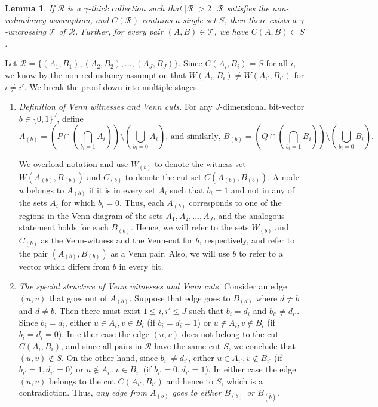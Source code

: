 \documentclass[11pt]{article}
\newtheorem{lemma}[theorem]{Lemma}
\newenvironment{proofnoqed}{{\bf Proof:}}{}
\newcommand{\coll}{{\mathcal R}}
\newcommand{\colltwo}{{\mathcal T}}
\begin{document}
\begin{lemma}
  \label{lem:uncross}
  If $\coll$ is a $\gamma$-thick collection such that $|\coll| > 2$, $\coll$
  satisfies the non-redundancy assumption, and $C(\coll)$ contains a single
  set $S$, then there exists a $\gamma$-uncrossing $\colltwo$ of
  $\coll$. Further, for every pair $(A,B)\in \colltwo$, we have $C(A,B)
  \subset S$.
\end{lemma}
\begin{proofnoqed}
  Let $\coll = \{(A_1,B_1), (A_2,B_2), \ldots, (A_J,B_J)\}$. Since $C(A_i,B_i)
  = S$ for all $i$, we know by the non-redundancy assumption that $W(A_i,B_i)
  \neq W(A_{i'},B_{i'})$ for $i\neq i'$. We break the proof down into multiple
  stages.

  \begin{enumerate}
  \item {\em Definition of Venn witnesses and Venn cuts. } For any
    $J$-dimensional bit-vector $b\in\{0,1\}^J$, define
    $$A_{(b)} = \left(P
      \cap \left(\bigcap_{b_i = 1} A_i\right)\right) \setminus
    \left(\bigcup_{b_i=0} A_i\right) \mbox{, and similarly, } B_{(b)} =
    \left(Q\cap\left(\bigcap_{b_i = 1} B_i\right)\right) \setminus
    \left(\bigcup_{b_i=0} B_i\right).$$

    We overload notation and use $W_{(b)}$ to denote the witness set
    $W(A_{(b)},B_{(b)})$ and $C_{(b)}$ to denote the cut set
    $C(A_{(b)},B_{(b)})$. A node $u$ belongs to $A_{(b)}$ if it is in every
    set $A_i$ such that $b_i=1$ and not in any of the sets $A_i$ for which
    $b_i=0$. Thus, each $A_{(b)}$ corresponds to one of the regions in the
    Venn diagram of the sets $A_1, A_2, \ldots, A_J$, and the analogous
    statement holds for each $B_{(b)}$. Hence, we will refer to the sets
    $W_{(b)}$ and $C_{(b)}$ as the Venn-witness and the Venn-cut for $b$,
    respectively, and refer to the pair $(A_{(b)},B_{(b)})$ as a Venn
    pair. Also, we will use $\overline{b}$ to refer to a vector which differs
    from $b$ in every bit.

  \item {\em The special structure of Venn witnesses and Venn cuts.} Consider
    an edge $(u,v)$ that goes out of $A_{(b)}$. Suppose that edge goes to
    $B_{(d)}$ where $d\neq b$ and $d\neq \overline{b}$. Then there must exist
    $1\leq i,i' \leq J$ such that $b_i = d_i$ and $b_{i'} \neq d_{i'}$. Since
    $b_i = d_i$, either $u\in A_i, v\in B_i$ (if $b_i = d_i = 1$) or $u\not\in
    A_i, v\not\in B_i$ (if $b_i = d_i = 0$). In either case the edge $(u,v)$
    does not belong to the cut $C(A_i, B_i)$, and since all pairs in $\coll$
    have the same cut $S$, we conclude that $(u,v) \not\in S$. On the other
    hand, since $b_{i'} \neq d_{i'}$, either $u\in A_{i'}, v\not\in B_{i'}$
    (if $b_{i'} = 1, d_{i'} = 0$) or $u\not\in A_{i'}, v\in B_{i'}$ (if
    $b_{i'} = 0, d_{i'} = 1$). In either case the edge $(u,v)$ belongs to the
    cut $C(A_{i'},B_{i'})$ and hence to $S$, which is a contradiction. Thus,
    {\em any edge from $A_{(b)}$ goes to either $B_{(b)}$ or
      $B_{(\overline{b})}$}.


\end{enumerate}
\end{proofnoqed}
\end{document}
